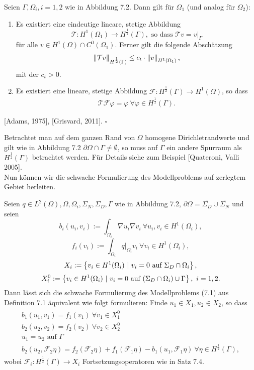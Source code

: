 Seien $\Gamma, \Omega_i,i=1,2$ wie in Abbildung 7.2.
Dann gilt für $\Omega_1$ (und analog für $\Omega_2$):
\begin{enumerate}[(1)]
	\item Es existiert eine eindeutige lineare, stetige Abbildung
	\[
	\mathcal{T}: H^1(\Omega_1) \to H^{\frac{1}{2}}(\Gamma), \text{ so dass } \mathcal{T}v=v|_\Gamma
	\]
	für alle $v\in H^1(\Omega)\cap C^0(\Omega_1)$.
	Ferner gilt die folgende Abschätzung
	\begin{align}
	\left\Vert\mathcal{T}v\right\Vert_{H^{\frac{1}{2}}(\Gamma)} \le c_t\cdot \left\Vert v\right\Vert_{H^1(\Omega_1)},
	\end{align}
	mit der  $c_t>0$.
	\item Es existiert eine lineare, stetige Abbildung $\mathcal{F}: H^{\frac{1}{2}}(\Gamma)\to H^1(\Omega)$, so dass
	\begin{align}
	\mathcal{T}\mathcal{F}\varphi = \varphi ~ \forall \varphi\in H^{\frac{1}{2}}(\Gamma).
	\end{align}
\end{enumerate}

 [Adams, 1975], [Grisvard, 2011].
\hfill $\square$

Betrachtet man auf dem ganzen Rand von $\Omega$ homogene Dirichletrandwerte und gilt wie in Abbildung 7.2 $\partial\Omega\cap \Gamma \neq \emptyset$, so muss auf $\Gamma$ ein andere Spurraum als $H^{\frac{1}{2}}(\Gamma)$ betrachtet werden.
Für Details siehe zum Beispiel [Quateroni, Valli 2005].\\

Nun können wir die schwache Formulierung des Modellproblems auf zerlegtem Gebiet herleiten.

Seien $q\in L^2(\Omega),\Omega,\Omega_i,\Sigma_N,\Sigma_D,\Gamma$ wie in Abbildung 7.2, $\partial\Omega=\bar{\Sigma_D}\cup \bar{\Sigma_N}$ und seien
\[
b_i(u_i,v_i) := \int_{\Omega_i} \nabla u_i\nabla v_i ~\forall u_i,v_i\in H^1(\Omega_i),
\]
\[
f_i(v_i):= \int_{\Omega_i} q|_{\Omega_i} v_i ~\forall v_i\in H^1(\Omega_i),
\]
\[
X_i:= \left\{v_i\in H^1(\Omega_i)~|~v_i=0\text{ auf }\Sigma_D\cap\Omega_i\right\},
\]
\[
X_i^0:=\left\{v_i\in H^1(\Omega_i)~|~v_i=0\text{ auf }(\Sigma_D\cap\Omega_i)\cup\Gamma\right\}, ~i=1,2.
\]
Dann lässt sich die schwache Formulierung des Modellproblems (7.1) aus Definition 7.1 äquivalent wie folgt formulieren:
Finde $u_1\in X_1,u_2\in X_2$, so dass
\begin{align}
\begin{split}
b_1(u_1,v_1)=f_1(v_1) ~\forall v_1\in X_1^0\\
b_2(u_2,v_2)=f_2(v_2) ~\forall v_2\in X_2^0\\
u_1=u_2 \text{ auf }\Gamma\\
b_2(u_2,\mathcal{F}_2\eta) = f_2(\mathcal{F}_2\eta) + f_1(\mathcal{F}_1\eta) - b_1(u_1,\mathcal{F}_1\eta) ~\forall\eta\in H^{\frac{1}{2}}(\Gamma),
\end{split}
\end{align}
wobei $\mathcal{F}_i:H^{\frac{1}{2}}(\Gamma)\to X_i$ Fortsetzungsoperatoren wie in Satz 7.4.\\

